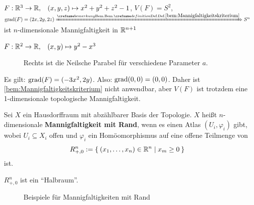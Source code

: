 \begin{beispiel}%
    \begin{bspenum}
        \item $F: \mathbb{R}^3 \rightarrow \mathbb{R},\;\;\; (x, y, z) \mapsto x^2 + y^2 + z^2 - 1$,
              $V(F) = S^2$, $\grad(F) = (2x, 2y, 2z) \xRightarrow{\crefabbr{bem:Mannigfaltigkeitskriterium}} S^n$
              ist $n$-dimensionale Mannigfaltigkeit in $\mathbb{R}^{n+1}$
        \item $F: \mathbb{R}^2 \rightarrow \mathbb{R}, \;\;\; (x,y) \mapsto y^2 - x^3$
            \begin{figure}[ht]
                \centering
                \subfloat[$F(x,y) = y^2 - x^3$]{
                    \resizebox{0.45\linewidth}{!}{}
                    \label{fig:semicubical-parabola-2d}
                }%
                \subfloat[$y^2 - ax^3 = 0$]{
                    \resizebox{0.45\linewidth}{!}{}
                    \label{fig:semicubical-parabola-3d}
                }%
                \label{Neilsche-Parabel}
                \caption{Rechts ist die Neilsche Parabel für verschiedene Parameter $a$.}
            \end{figure}
              Es gilt: $\operatorname{grad}(F) = (-3x^2, 2y)$. Also: $\operatorname{grad}(0,0) = (0,0)$.
              Daher ist \cref{bem:Mannigfaltigkeitskriterium}
              nicht anwendbar, aber $V(F)$ ist trotzdem
              eine 1-dimensionale topologische Mannigfaltigkeit.
    \end{bspenum}
\end{beispiel}

\begin{definition}%
    Sei $X$ ein Hausdorffraum mit abzählbarer Basis der Topologie.
    $X$ heißt $n$-dimensionale \textbf{Mannigfaltigkeit mit Rand},
    wenn es einen Atlas $(U_i, \varphi_i)$ gibt, wobei $U_i \subseteq X_i$
    offen und $\varphi_i$ ein Homöomorphismus auf eine offene 
    Teilmenge von 
    \[R_{+,0}^n := \Set{(x_1, \dots, x_n) \in \ensuremath{\mathbb{R}}^n | x_m \geq 0}\]
    ist.
\end{definition}

$R_{+,0}^n$ ist ein \enquote{Halbraum}.

\begin{figure}[ht]
    \centering
    \subfloat[Halbraum]{
        
        \label{fig:half-space}
    }%

    \label{Mannigfaltigkeiten mit Rand}
    \caption{Beispiele für Mannigfaltigkeiten mit Rand}
\end{figure}

